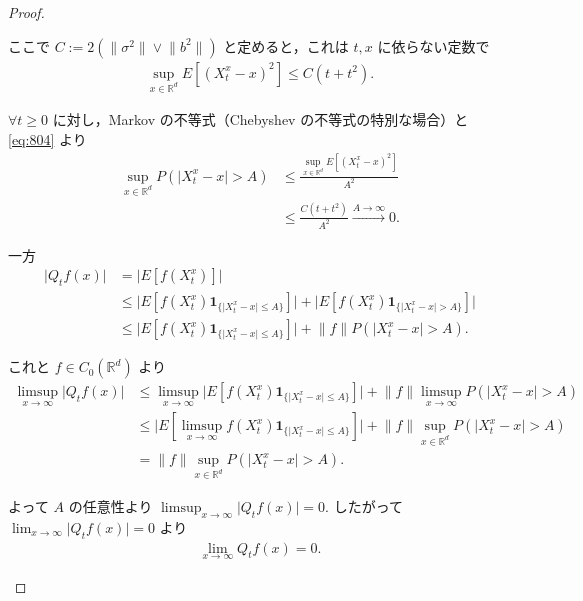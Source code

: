 \documentclass{jsarticle}
\begin{document}
\begin{proof}
\begin{enumerate}[label=(\arabic*)]
\begin{enumerate}[label=(\roman*)]
            ここで $C:=2(\lVert \sigma^2\rVert\vee\lVert b^2\rVert)$ と定めると，これは $t, x$ に依らない定数で
            \setcounter{equation}{3}
            \begin{align}
                \sup_{x\in\mathbb{R}^d}E[(X_{t}^{x}-x)^2]
                \le C(t+t^2).
                \label{eq:804}
            \end{align}

            $\forall t\ge0$ に対し，Markov の不等式（Chebyshev の不等式の特別な場合）と \eqref{eq:804} より
            \begin{align}
                \sup_{x\in\mathbb{R}^d}P(\lvert X_{t}^{x}-x\rvert>A)
                &\le \frac{\sup_{x\in\mathbb{R}^d}E[(X_{t}^{x}-x)^2]}{A^2} \\
                &\le \frac{C(t+t^2)}{A^2}\xrightarrow{A\to\infty}0.
            \end{align}

            一方
            \begin{align}
                \lvert Q_{t}f(x)\rvert
                &= \lvert E[f(X_{t}^{x})]\rvert \\
                &\le \lvert E[f(X_{t}^{x})\bm{1}_{\{\lvert X_{t}^{x}-x\rvert\le A\}}]\rvert
                + \lvert E[f(X_{t}^{x})\bm{1}_{\{\lvert X_{t}^{x}-x\rvert>A\}}]\rvert \\
                &\le \lvert E[f(X_{t}^{x})\bm{1}_{\{\lvert X_{t}^{x}-x\rvert\le A\}}]\rvert
                + \lVert f\rVert P(\lvert X_{t}^{x}-x\rvert>A).
            \end{align}

            これと $f\in C_{0}(\mathbb{R}^d)$ より
            \begin{align}
                \limsup_{x\to\infty}\lvert Q_{t}f(x)\rvert
                &\le \limsup_{x\to\infty}\lvert E[f(X_{t}^{x})\bm{1}_{\{\lvert X_{t}^{x}-x\rvert\le A\}}]\rvert
                + \lVert f\rVert \limsup_{x\to\infty}P(\lvert X_{t}^{x}-x\rvert>A) \\
                &\le \lvert E[\limsup_{x\to\infty}f(X_{t}^{x})\bm{1}_{\{\lvert X_{t}^{x}-x\rvert\le A\}}]\rvert
                + \lVert f\rVert \sup_{x\in\mathbb{R}^d}P(\lvert X_{t}^{x}-x\rvert>A) \\
                &= \lVert f\rVert \sup_{x\in\mathbb{R}^d}P(\lvert X_{t}^{x}-x\rvert>A).
            \end{align}

            よって $A$ の任意性より $\limsup_{x\to\infty}\lvert Q_{t}f(x)\rvert=0.$
            したがって $\lim_{x\to\infty}\lvert Q_{t}f(x)\rvert=0$ より 
            \begin{align}
                \lim_{x\to\infty}Q_{t}f(x)=0.
            \end{align}


\end{enumerate}
\end{enumerate}
\end{proof}
\end{document}
